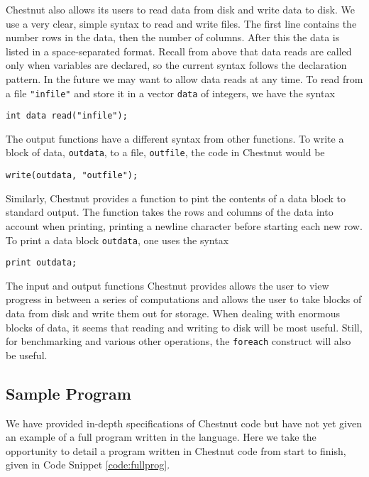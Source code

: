 \documentclass[twocolumn]{article}
\renewcommand{\|}{\origbar} %
\newcommand{\code}[1]{\texttt{#1}}
\begin{document}
Chestnut also allows its users to read data from disk and write data to disk. We use a very clear, simple syntax to read and write files. The first line contains the number rows in the data, then the number of columns. After this the data is listed in a space-separated format. Recall from above that data reads are called only when variables are declared, so the current syntax follows the declaration pattern. In the future we may want to allow data reads at any time. To read from a file \code{"infile"} and store it in a vector \code{data} of integers, we have the syntax
\begin{center}
  \code{int data read("infile");}
\end{center}

The output functions have a different syntax from other functions. To write a block of data, \code{outdata}, to a file, \code{outfile}, the code in Chestnut would be
\begin{center}
  \code{write(outdata, "outfile");}
\end{center}

Similarly, Chestnut provides a function to pint the contents of a data block to standard output. The function takes the rows and columns of the data into account when printing, printing a newline character before starting each new row. To print a data block \code{outdata}, one uses the syntax
\begin{center}
  \code{print outdata;}
\end{center}

The input and output functions Chestnut provides allows the user to view progress in between a series of computations and allows the user to take blocks of data from disk and write them out for storage. When dealing with enormous blocks of data, it seems that reading and writing to disk will be most useful. Still, for benchmarking and various other operations, the \code{foreach} construct will also be useful.

\subsection{Sample Program}


We have provided in-depth specifications of Chestnut code but have not yet given an example of a full program written in the language. Here we take the opportunity to detail a program written in Chestnut code from start to finish, given in Code Snippet \ref{code:fullprog}. 
\end{document}
